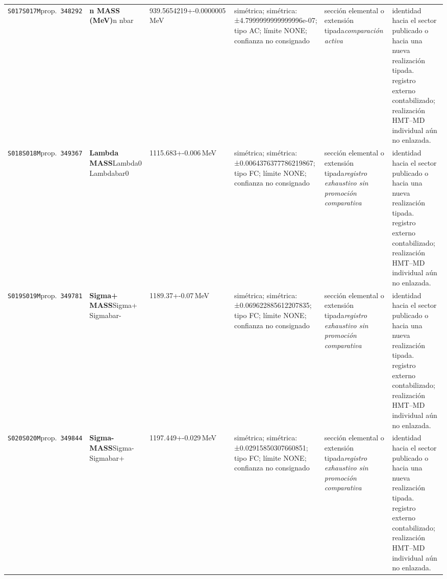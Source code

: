 \begin{landscape}
\begin{longtable}{L{1.85cm}L{4.45cm}L{2.35cm}L{4.05cm}L{3.35cm}L{7.15cm}}
\texttt{S017}\newline \texttt{S017M}\newline prop.\ \texttt{348292} & \textbf{n MASS (MeV)}\newline n \textbar{}\allowbreak{} nbar & 939.5654219+-0.0000005\,MeV & simétrica; simétrica: ±4.7999999999999996e-07; tipo AC; límite NONE; confianza no consignado & sección elemental o extensión tipada\newline \emph{comparación activa} & identidad hacia el sector publicado o hacia una nueva realización tipada. registro externo contabilizado; realización HMT--MD individual aún no enlazada. \\
\texttt{S018}\newline \texttt{S018M}\newline prop.\ \texttt{349367} & \textbf{Lambda MASS}\newline Lambda0 \textbar{}\allowbreak{} Lambdabar0 & 1115.683+-0.006\,MeV & simétrica; simétrica: ±0.0064376377786219867; tipo FC; límite NONE; confianza no consignado & sección elemental o extensión tipada\newline \emph{registro exhaustivo sin promoción comparativa} & identidad hacia el sector publicado o hacia una nueva realización tipada. registro externo contabilizado; realización HMT--MD individual aún no enlazada. \\
\texttt{S019}\newline \texttt{S019M}\newline prop.\ \texttt{349781} & \textbf{Sigma+ MASS}\newline Sigma+ \textbar{}\allowbreak{} Sigmabar- & 1189.37+-0.07\,MeV & simétrica; simétrica: ±0.069622885612207835; tipo FC; límite NONE; confianza no consignado & sección elemental o extensión tipada\newline \emph{registro exhaustivo sin promoción comparativa} & identidad hacia el sector publicado o hacia una nueva realización tipada. registro externo contabilizado; realización HMT--MD individual aún no enlazada. \\
\texttt{S020}\newline \texttt{S020M}\newline prop.\ \texttt{349844} & \textbf{Sigma- MASS}\newline Sigma- \textbar{}\allowbreak{} Sigmabar+ & 1197.449+-0.029\,MeV & simétrica; simétrica: ±0.02915850307660851; tipo FC; límite NONE; confianza no consignado & sección elemental o extensión tipada\newline \emph{registro exhaustivo sin promoción comparativa} & identidad hacia el sector publicado o hacia una nueva realización tipada. registro externo contabilizado; realización HMT--MD individual aún no enlazada. \\

\end{longtable}
\end{landscape}

